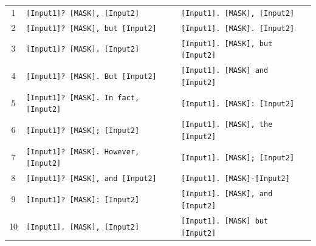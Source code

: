 \documentclass{article}
\theoremstyle{plain}
\theoremstyle{definition}
\theoremstyle{remark}
\begin{document}
\begin{table}[t]
{\begin{tabular}{c|l|l}
    \midrule
        1 & \texttt{[Input1]? [MASK], [Input2]} &  \texttt{[Input1]. [MASK], [Input2]} \\
        2 & \texttt{[Input1]? [MASK], but [Input2]} & \texttt{[Input1]. [MASK]. [Input2]}\\
        3 & \texttt{[Input1]? [MASK]. [Input2]} & \texttt{[Input1]. [MASK], but [Input2]}\\
        4 & \texttt{[Input1]? [MASK]. But [Input2]}  & \texttt{[Input1]. [MASK] and [Input2]} \\
        5 & \texttt{[Input1]? [MASK]. In fact, [Input2]} & \texttt{[Input1]. [MASK]: [Input2]} \\
        6 & \texttt{[Input1]? [MASK]; [Input2]} & \texttt{[Input1]. [MASK], the [Input2]}\\
        7 & \texttt{[Input1]? [MASK]. However, [Input2]} & \texttt{[Input1]. [MASK]; [Input2]}\\
        8 & \texttt{[Input1]? [MASK], and [Input2]} & \texttt{[Input1]. [MASK]-[Input2]} \\
        9 & \texttt{[Input1]? [MASK]: [Input2]}  &\texttt{[Input1]. [MASK], and [Input2]} \\
        10 & \texttt{[Input1]. [MASK], [Input2]} &\texttt{[Input1]. [MASK] but [Input2]} \\
    \bottomrule[1pt]
    \end{tabular}
    }
\end{table}
\end{document}
